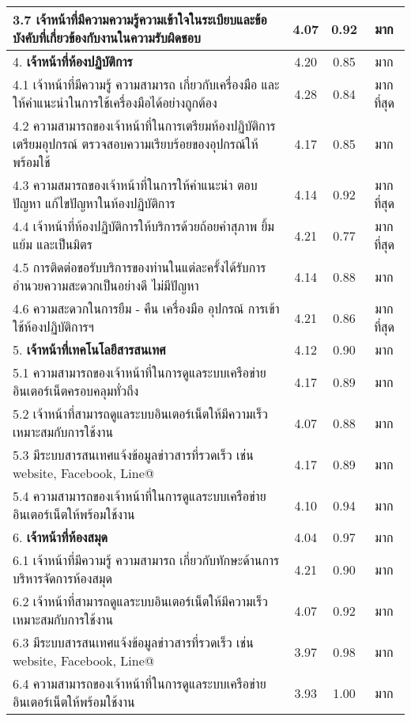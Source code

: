 \begin{longtable}{|>{\raggedright}p{9cm}|c|c|c|}
	3.7 เจ้าหน้าที่มีความความรู้ความเข้าใจในระเบียบและข้อบังคับที่เกี่ยวข้องกับงานในความรับผิดชอบ & 4.07 & 0.92 & มาก\\\hline
	4. \textbf{เจ้าหน้าที่ห้องปฏิบัติการ} & 4.20 & 0.85 &  มาก \\ \hline
	4.1 เจ้าหน้าที่มีความรู้ ความสามารถ เกี่ยวกับเครื่องมือ และ ให้คำแนะนำในการใช้เครื่องมือได้อย่างถูกต้อง & 4.28 & 0.84 & มากที่สุด\\\hline
	4.2 ความสามารถของเจ้าหน้าที่ในการเตรียมห้องปฏิบัติการ เตรียมอุปกรณ์ ตรวจสอบความเรียบร้อยของอุปกรณ์ให้พร้อมใช้ & 4.17 & 0.85 & มาก\\\hline
	4.3 ความสมารถของเจ้าหน้าที่ในการให้คำแนะนำ ตอบปัญหา แก้ไขปัญหาในห้องปฏิบัติการ & 4.14 & 0.92 & มากที่สุด\\\hline
	4.4 เจ้าหน้าที่ห้องปฏิบัติการให้บริการด้วยถ้อยคำสุภาพ ยิ้มแย้ม และเป็นมิตร & 4.21 & 0.77 & มากที่สุด\\\hline
	4.5 การติดต่อขอรับบริการของท่านในแต่ละครั้งได้รับการอำนวยความสะดวกเป็นอย่างดี ไม่มีปัญหา & 4.14 & 0.88 & มาก\\\hline
	4.6 ความสะดวกในการยืม - คืน เครื่องมือ อุปกรณ์ การเข้าใช้ห้องปฏิบัติการฯ & 4.21 & 0.86 & มากที่สุด\\\hline	
	5. \textbf{เจ้าหน้าที่เทคโนโลยีสารสนเทศ} & 4.12 &  0.90 & มาก  \\ \hline
	5.1 ความสามารถของเจ้าหน้าที่ในการดูแลระบบเครือข่ายอินเตอร์เน็ตครอบคลุมทั่วถึง & 4.17 & 0.89 & มาก\\\hline
	5.2 เจ้าหน้าที่สามารถดูแลระบบอินเตอร์เน็ตให้มีความเร็วเหมาะสมกับการใช้งาน & 4.07 & 0.88 & มาก\\\hline
	5.3 มีระบบสารสนเทศแจ้งข้อมูลข่าวสารที่รวดเร็ว เช่น website, Facebook, Line@ & 4.17 & 0.89 & มาก\\\hline
	5.4 ความสามารถของเจ้าหน้าที่ในการดูแลระบบเครือข่ายอินเตอร์เน็ตให้พร้อมใช้งาน & 4.10 & 0.94 & มาก\\\hline
	6. \textbf{เจ้าหน้าที่ห้องสมุด} & 4.04 & 0.97 &  มาก\\ \hline
	6.1 เจ้าหน้าที่มีความรู้ ความสามารถ เกี่ยวกับทักษะด้านการบริหารจัดการห้องสมุด & 4.21 & 0.90 & มาก\\\hline
	6.2 เจ้าหน้าที่สามารถดูแลระบบอินเตอร์เน็ตให้มีความเร็วเหมาะสมกับการใช้งาน & 4.07 & 0.92 & มาก\\\hline
	6.3 มีระบบสารสนเทศแจ้งข้อมูลข่าวสารที่รวดเร็ว เช่น website, Facebook, Line@ & 3.97 & 0.98 & มาก\\\hline
	6.4 ความสามารถของเจ้าหน้าที่ในการดูแลระบบเครือข่ายอินเตอร์เน็ตให้พร้อมใช้งาน & 3.93 & 1.00 & มาก\\\hline

\end{longtable}
